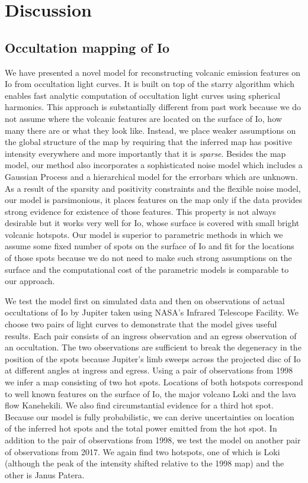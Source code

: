 \documentclass[modern]{aastex62}
\begin{document}
\section{Discussion}
\label{sec:discussion}
\subsection{Occultation mapping of Io}
We have presented a novel model for reconstructing volcanic emission features on Io from occultation light curves.
It is built on top of the \textsf{starry} algorithm which enables fast analytic computation of occultation light curves using spherical harmonics.
This approach is substantially different from past work because we do not assume where the volcanic features are located on the surface of Io, how many there are or what they look like.
Instead, we place weaker assumptions on the global structure of the map by requiring that the inferred map has positive intensity everywhere and more importantly that it is \emph{sparse}.
Besides the map model, our method also incorporates a sophisticated noise model which includes a Gaussian Process and a hierarchical model for the errorbars which are unknown.
As a result of the sparsity and positivity constraints and the flexible noise model,
our model is parsimonious, it places features on the map only if the data provides strong evidence for existence of those features.
This property is not always desirable but it works very well for Io, whose surface is covered with small bright volcanic hotspots.
Our model is superior to parametric methods in which we assume some fixed number of spots on the surface of Io and fit for the locations of those spots because we do not need to make such strong assumptions on the surface and the computational cost of the parametric models is comparable to our approach.

We test the model first on simulated data and then on observations of actual occultations of Io by Jupiter taken using NASA's Infrared Telescope Facility.
We choose two pairs of light curves to demonstrate that the model gives useful results.
Each pair consists of an ingress observation and an egress observation of an occultation. 
The two observations are sufficient to break the degeneracy in the position of the spots because Jupiter's limb sweeps across the projected disc of Io at different angles at ingress and egress.
Using a pair of observations from 1998 we infer a map consisting of two hot spots.
Locations of both hotspots correspond to well known features on the surface of Io, the major volcano Loki and the lava flow Kanehekili.
We also find circumstantial evidence for a third hot spot.
Because our model is fully probabilistic, we can derive uncertainties on location of the inferred hot spots and the total power emitted from the hot spot.
In addition to the pair of observations from 1998, we test the model on another pair of observations from 2017.
We again find two hotspots, one of which is Loki (although the peak of the intensity shifted relative to the 1998 map) and the other is Janus Patera.
\end{document}
